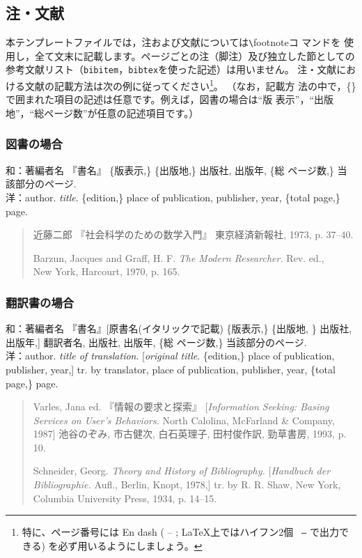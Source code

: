 \documentclass[b5paper,10pt,twocolumn,tombow]{jarticle}
\begin{document}
\subsection{注・文献} \label{123950_27Oct08}
本テンプレートファイルでは，注および文献については\verb|\|footnoteコ
マンドを
使用し，全て文末に記載します。ページごとの注（脚注）及び独立した節としての参考文献リスト（\texttt{bibitem}，\texttt{bibtex}を使った記述）は用いません。
注・文献における文献の記載方法は次の例に従ってください\footnote{特に、ページ番号には En dash ( -- ; \LaTeX 上ではハイフン2個 \texttt{ --} で出力できる) を必ず用いるようにしましょう。}。
（なお，記載方
法の中で，\{\}で囲まれた項目の記述は任意です。例えば，図書の場合は``版
表示''，``出版地''，``総ページ数''が任意の記述項目です。）

\subsubsection{図書の場合}
\noindent{}和：著編者名 『書名』 \{版表示,\} \{出版地,\} 出版社, 出版年, \{総
\bigskip
ページ数,\} 当該部分のページ.\\
洋：author. \textit{title}. \{edition,\} place of publication,
publisher, year, \{total page,\} page.
\begin{quote}
 近藤二郎 『社会科学のための数学入門』 東京経済新報社, 1973,
 p. 37--40.

 Barzun, Jacques and Graff, H. F. \textit{The Modern Researcher.}
 Rev. ed., \\New York, Harcourt, 1970, p. 165.
\end{quote}


\subsubsection{翻訳書の場合}
\noindent{}和：著編者名 『書名』[原書名(イタリックで記載) \{版表示,\}
\{出版地, \} 出版社, 出版年,] 翻訳者名, 出版社, 出版年, \{総
\bigskip
ページ数,\} 当該部分のページ.\\
洋：author. \textit{title of translation}. [\textit{original
title}. \{edition,\} place of publication, publisher, year,] tr. by
translator, place of publication, publisher, year, \{total page,\} page.

\begin{quote}
Varles, Jana ed. 『情報の要求と探索』 [\textit{Information Seeking:
 Basing Services on User's Behaviors.} North Calolina,
 McFarland \& Company, 1987] 池谷のぞみ, 市古健次, 白石英理子, 田村俊作訳,
 勁草書房, 1993, p. 10.

Schneider, Georg. \textit{Theory and History of Bibliography.}
 [\textit{Handbuch der Bibliographie.} Aufl., Berlin, Knopt, 1978,]
 tr. by R. R. Shaw, New York, Columbia University Press, 1934, p. 14--15.
\end{quote}
\end{document}
